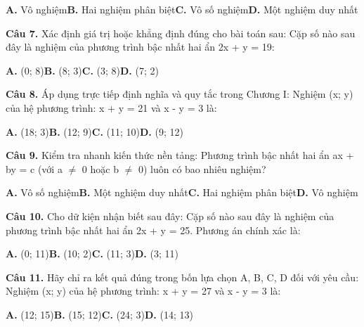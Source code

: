 \documentclass[11pt,a4paper]{article}
\begin{document}
\hspace*{1.5em}\textbf{A.} Vô nghiệm\quad\quad \textbf{B.} Hai nghiệm phân biệt\quad\quad \textbf{C.} Vô số nghiệm\quad\quad \textbf{D.} Một nghiệm duy nhất\par\vspace{2pt}
\textbf{\color{primary} Câu 7.} Xác định giá trị hoặc khẳng định đúng cho bài toán sau: Cặp số nào sau đây là nghiệm của phương trình bậc nhất hai ẩn 2x + y = 19:\par
\hspace*{1.5em}\textbf{A.} (0; 8)\quad\quad \textbf{B.} (8; 3)\quad\quad \textbf{C.} (3; 8)\quad\quad \textbf{D.} (7; 2)\par\vspace{2pt}
\textbf{\color{primary} Câu 8.} Áp dụng trực tiếp định nghĩa và quy tắc trong Chương I: Nghiệm (x; y) của hệ phương trình: x + y = 21 và x - y = 3 là:\par
\hspace*{1.5em}\textbf{A.} (18; 3)\quad\quad \textbf{B.} (12; 9)\quad\quad \textbf{C.} (11; 10)\quad\quad \textbf{D.} (9; 12)\par\vspace{2pt}
\textbf{\color{primary} Câu 9.} Kiểm tra nhanh kiến thức nền tảng: Phương trình bậc nhất hai ẩn ax + by = c (với a $\ne$ 0 hoặc b $\ne$ 0) luôn có bao nhiêu nghiệm?\par
\hspace*{1.5em}\textbf{A.} Vô số nghiệm\quad\quad \textbf{B.} Một nghiệm duy nhất\quad\quad \textbf{C.} Hai nghiệm phân biệt\quad\quad \textbf{D.} Vô nghiệm\par\vspace{2pt}
\textbf{\color{primary} Câu 10.} Cho dữ kiện nhận biết sau đây: Cặp số nào sau đây là nghiệm của phương trình bậc nhất hai ẩn 2x + y = 25. Phương án chính xác là:\par
\hspace*{1.5em}\textbf{A.} (0; 11)\quad\quad \textbf{B.} (10; 2)\quad\quad \textbf{C.} (11; 3)\quad\quad \textbf{D.} (3; 11)\par\vspace{2pt}
\textbf{\color{primary} Câu 11.} Hãy chỉ ra kết quả đúng trong bốn lựa chọn A, B, C, D đối với yêu cầu: Nghiệm (x; y) của hệ phương trình: x + y = 27 và x - y = 3 là:\par
\hspace*{1.5em}\textbf{A.} (12; 15)\quad\quad \textbf{B.} (15; 12)\quad\quad \textbf{C.} (24; 3)\quad\quad \textbf{D.} (14; 13)\par\vspace{2pt}
\end{document}
